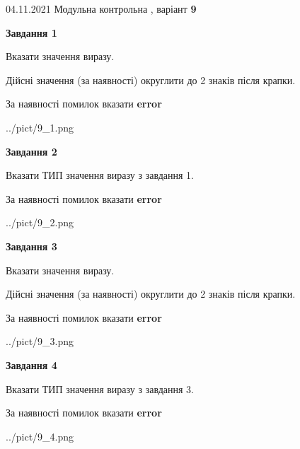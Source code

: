 \documentclass[11pt, ukrainian]{article}
\begin{document}
{04.11.2021 Модульна контрольна , варіант  \No \textbf { 9 }\par}
{
\begin {large}
{\begin {center}\textbf{Завдання 1}\end {center}}\par
Вказати значення виразу. \par
Дійсні значення (за наявності) округлити до 2 знаків після крапки. \par
За наявності помилок вказати \textbf{error}

\begin{center}
	{../pict/9_1.png}
\end{center}
\newpage

{\begin {center}\textbf{Завдання 2}\end {center}}\par
Вказати ТИП значення виразу з завдання 1. \par
За наявності помилок вказати \textbf{error}

\begin{center}
	{../pict/9_2.png}
\end{center}
\newpage

{\begin {center}\textbf{Завдання 3}\end {center}}\par
Вказати значення виразу. \par
Дійсні значення (за наявності) округлити до 2 знаків після крапки. \par
За наявності помилок вказати \textbf{error}

\begin{center}
	{../pict/9_3.png}
\end{center}
\newpage

{\begin {center}\textbf{Завдання 4}\end {center}}\par
Вказати ТИП значення виразу з завдання 3. \par
За наявності помилок вказати \textbf{error}

\begin{center}
	{../pict/9_4.png}
\end{center}
\newpage


\end{large}}
\end{document}
